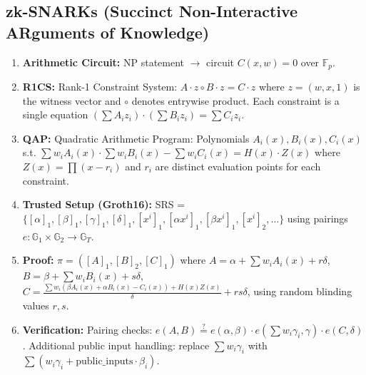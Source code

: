 \subsection{zk-SNARKs (Succinct Non-Interactive ARguments of Knowledge)}
\label{sec:zk:snark}

\begin{enumerate}
\item \textbf{Arithmetic Circuit:} NP statement $\to$ circuit $C(x,w)=0$ over $\mathbb{F}_p$.
\item \textbf{R1CS:} Rank-1 Constraint System: $A \cdot z \circ B \cdot z = C \cdot z$ where $z = (w, x, 1)$ is the witness vector and $\circ$ denotes entrywise product. Each constraint is a single equation $(\sum A_i z_i) \cdot (\sum B_i z_i) = \sum C_i z_i$.
\item \textbf{QAP:} Quadratic Arithmetic Program: Polynomials $A_i(x), B_i(x), C_i(x)$ s.t. $\sum w_i A_i(x) \cdot \sum w_i B_i(x) - \sum w_i C_i(x) = H(x) \cdot Z(x)$ where $Z(x) = \prod (x - r_i)$ and $r_i$ are distinct evaluation points for each constraint.
\item \textbf{Trusted Setup (Groth16):} SRS = $\{ [\alpha]_1, [\beta]_1, [\gamma]_1, [\delta]_1, [x^i]_1, [\alpha x^i]_1, [\beta x^i]_1, [x^i]_2, \dots \}$ using pairings $e: \mathbb{G}_1 \times \mathbb{G}_2 \to \mathbb{G}_T$.
\item \textbf{Proof:} $\pi = ([A]_1, [B]_2, [C]_1)$ where $A = \alpha + \sum w_i A_i(x) + r \delta$, $B = \beta + \sum w_i B_i(x) + s \delta$, $C = \frac{\sum w_i (\beta A_i(x) + \alpha B_i(x) - C_i(x)) + H(x)Z(x)}{\delta} + r s \delta$, using random blinding values $r, s$.
\item \textbf{Verification:} Pairing checks: $e(A,B) \stackrel{?}{=} e(\alpha,\beta) \cdot e(\sum w_i \gamma_i, \gamma) \cdot e(C,\delta)$. Additional public input handling: replace $\sum w_i \gamma_i$ with $\sum (w_i \gamma_i + \text{public\_inputs}\cdot \beta_i)$.
\end{enumerate}

